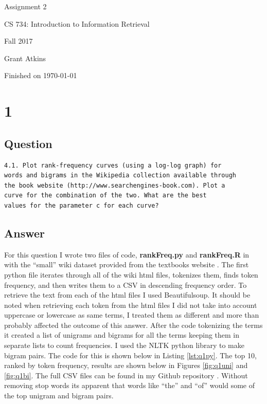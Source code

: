 \documentclass[letterpaper,11pt]{article}
\begin{document}
\begin{titlepage}

\begin{center}

\Huge{Assignment 2}

\Large{CS 734:  Introduction to Information Retrieval}

\Large{Fall 2017}

\Large{Grant Atkins}

\Large Finished on \today

\end{center}

\end{titlepage}

\newpage


\section*{1}

\subsection*{Question}

\begin{verbatim}
4.1. Plot rank-frequency curves (using a log-log graph) for 
words and bigrams in the Wikipedia collection available through 
the book website (http://www.searchengines-book.com). Plot a 
curve for the combination of the two. What are the best 
values for the parameter c for each curve?
\end{verbatim}

\subsection*{Answer}

For this question I wrote two files of code, \textbf{rankFreq.py} and \textbf{rankFreq.R} in with the ``small'' wiki dataset provided from the textbooks website . 
The first python file iterates through all of the wiki html files, tokenizes them, finds token frequency, and then writes them to a CSV in descending frequency order.
To retrieve the text from each of the html files I used Beautifulsoup. 
It should be noted when retrieving each token from the html files I did not take into account uppercase or lowercase as same terms, I treated them as different and more than probably affected the outcome of this answer.
After the code tokenizing the terms it created a list of unigrams and bigrams for all the terms keeping them in separate lists to count frequencies.
I used the NLTK python library to make bigram pairs.
The code for this is shown below in Listing \ref{lst:q1py}.
The top 10, ranked by token frequency, results are shown below in Figures \ref{fig:q1uni} and \ref{fig:q1bi}.
The full CSV files can be found in my Github repository \cite{github}.
Without removing stop words its apparent that words like ``the'' and ``of'' would some of the top unigram and bigram pairs.
\end{document}
